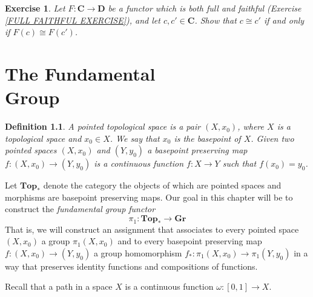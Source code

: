 \documentclass[11pt, letterpaper, oneside]{report}
\renewcommand{\chaptermark}[1]{\markboth{#1}{}}
\theoremstyle{pplain}
\theoremstyle{ddefinition}
\newtheorem{definition}[theorem]{Definition}
\theoremstyle{nnn}
\theoremstyle{eexercise}
\newtheorem{exercise}{Exercise}[chapter]
\newcommand{\CC}{{\mathbf C}}
\newcommand{\DD}{{\mathbf D}}
\newcommand{\Gr}{{\mathbf{Gr}}}
\newcommand{\Top}{{\mathbf{Top}}}
\begin{document}
\begin{exercise}
Let $F\colon \CC\to \DD$ be a functor which is both full and faithful (Exercise \ref{FULL FAITHFUL EXERCISE}), 
and let $c, c' \in \CC$. Show that $c\cong c'$ if and only if $F(c)\cong F(c')$. 
\end{exercise}








\newpage

\chapter[The Fundamental Group]{The Fundamental \\ Group}

\chaptermark{The Fundamental Group}
\label{FUND GP CHAPTER}

\thispagestyle{firststyle}

\begin{definition} A \emph{pointed topological space} is a pair $(X, x_{0})$, where 
$X$ is a topological space and $x_{0}\in X$. We say that $x_{0}$ is the \emph{basepoint}
of $X$. Given two pointed spaces $(X, x_{0})$ and $(Y, y_{0})$ a \emph{basepoint preserving 
map} $f\colon (X, x_{0}) \to (Y, y_{0})$ is a continuous function $f\colon X \to Y$ such that $f(x_{0}) = y_{0}$. 
\end{definition}


Let $\Top_{\ast}$ denote the category the objects of which are pointed spaces and morphisms 
are basepoint preserving maps. Our goal in this chapter will be to construct the 
\emph{fundamental group functor} 
$$\pi_{1}\colon \Top_{\ast} \to \Gr$$
That is, we will construct an assignment that associates to every pointed space $(X, x_{0})$
a group $\pi_{1}(X, x_{0})$ and to every basepoint preserving map $f\colon (X, x_{0}) \to (Y, y_{0})$ 
a group homomorphism $f_{\ast}\colon \pi_{1}(X, x_{0}) \to \pi_{1}(Y, y_{0})$ in a way that 
preserves  identity functions and compositions of functions.

Recall that a path in a space $X$ is a continuous function $\omega \colon [0, 1] \to X$. 
\end{document}
